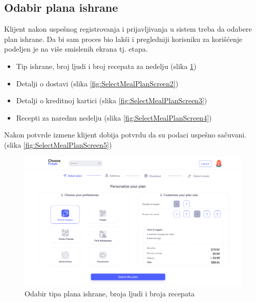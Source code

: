 \subsection{Odabir plana ishrane}

Klijent nakon uspešnog registrovanja i prijavljivanja u sistem treba da odabere plan ishrane. Da bi sam proces bio lakši i pregledniji korisniku za korišćenje podeljen je na više smislenih ekrana tj. etapa.
\begin{itemize}
    \item Tip ishrane, broj ljudi i broj recepata za nedelju (slika \ref{fig:SelectMealPlanScreen1})
    \item Detalji o dostavi (slika \ref{fig:SelectMealPlanScreen2})
    \item Detalji o kreditnoj kartici (slika \ref{fig:SelectMealPlanScreen3})
    \item Recepti za narednu nedelju (slika \ref{fig:SelectMealPlanScreen4})
\end{itemize}
Nakon potvrde izmene klijent dobija potvrdu da su podaci uspešno sačuvani. (slika \ref{fig:SelectMealPlanScreen5})

\begin{figure}[H]
	\begin{center}
		\includegraphics[width=\textwidth]{UI/Select Meal Plan (Screen 1).png}
    		\caption{Odabir tipa plana ishrane, broja ljudi i broja recepata}
    \label{fig:SelectMealPlanScreen1}
    \end{center}
\end{figure}

